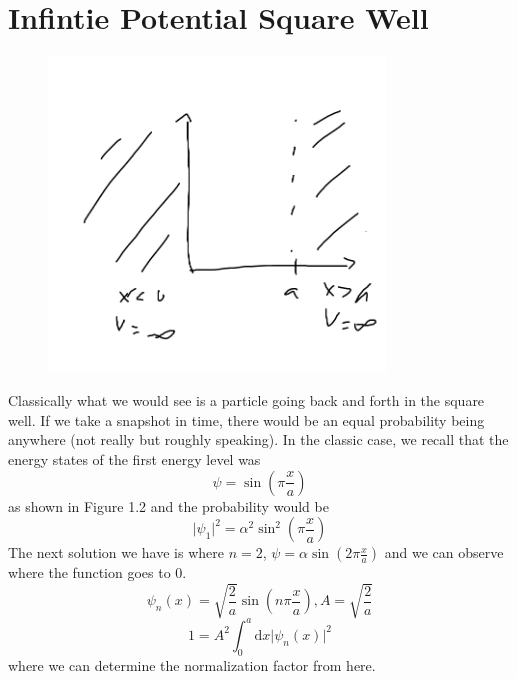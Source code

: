 \section{Infintie Potential Square Well}
\begin{remark}
    \begin{figure}[H]
        \centering
        \includegraphics[width=0.8\textwidth]{Figures/02.png}
        \caption{}
        \label{fig:}
    \end{figure}
    Classically what we would see is a particle going back and forth in the square well. If we take a snapshot in time, 
    there would be an equal probability being anywhere (not really but roughly speaking). In the classic case, we recall 
    that the energy states of the first energy level was 
    \[
        \psi  = \sin (\pi \frac{x}{a})
    \]
    as shown in Figure 1.2 and the probability would be 
    \[
        \vert \psi _1 \vert ^{2}  =\alpha ^{2}  \sin  ^{2}  (\pi \frac{x}{a})
    \]
    The next solution we have is where \(n =2 \),  \(\psi  = \alpha  \sin  (2\pi \frac{x}{a})\) and we can observe 
    where the function goes to 0. 
    \[
        \psi _n (x) = \sqrt{\frac{2}{a}} \sin (n \pi \frac{x}{a}), A = \sqrt{\frac{2}{a}} 
    \]
    \[
         1 = A ^{2}  \int_0^a  \mathrm{d}x \vert \psi _n(x) \vert ^{2} 
    \]
    where we can determine the normalization factor from here. 
\end{remark}
